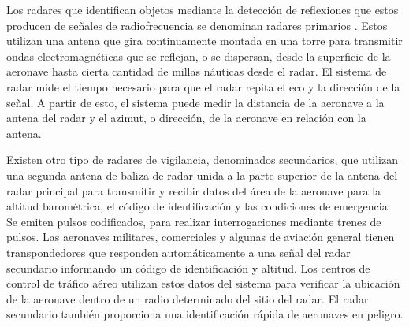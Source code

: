 Los radares que identifican objetos mediante la detección de reflexiones que estos producen de señales de radiofrecuencia se denominan radares primarios \citep{PSR}. Estos utilizan una antena que gira continuamente montada en una torre para transmitir ondas electromagnéticas que se reflejan, o se dispersan, desde la superficie de la aeronave hasta cierta cantidad de millas náuticas desde el radar. El sistema de radar mide el tiempo necesario para que el radar repita el eco y la dirección de la señal. A partir de esto, el sistema puede medir la distancia de la aeronave a la antena del radar y el azimut, o dirección, de la aeronave en relación con la antena.

Existen otro tipo de radares de vigilancia, denominados secundarios, que utilizan una segunda antena de baliza de radar unida a la parte superior de la antena del radar principal para transmitir y recibir datos del área de la aeronave para la altitud barométrica, el código de identificación y las condiciones de emergencia. Se emiten pulsos codificados, para realizar interrogaciones mediante trenes de pulsos. Las aeronaves militares, comerciales y algunas de aviación general tienen transpondedores que responden automáticamente a una señal del radar secundario informando un código de identificación y altitud. Los centros de control de tráfico aéreo utilizan estos datos del sistema para verificar la ubicación de la aeronave dentro de un radio determinado del sitio del radar. El radar secundario también proporciona una identificación rápida de aeronaves en peligro.

